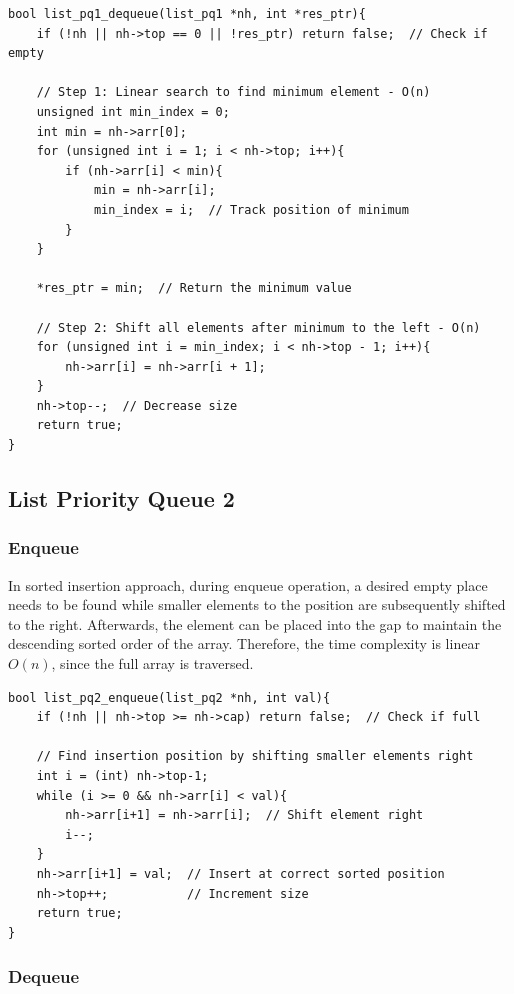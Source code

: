 \documentclass[a4paper,11pt]{article}
\begin{document}
\begin{verbatim}
bool list_pq1_dequeue(list_pq1 *nh, int *res_ptr){
    if (!nh || nh->top == 0 || !res_ptr) return false;  // Check if empty

    // Step 1: Linear search to find minimum element - O(n)
    unsigned int min_index = 0;
    int min = nh->arr[0];
    for (unsigned int i = 1; i < nh->top; i++){
        if (nh->arr[i] < min){
            min = nh->arr[i];
            min_index = i;  // Track position of minimum
        }
    }
    
    *res_ptr = min;  // Return the minimum value
    
    // Step 2: Shift all elements after minimum to the left - O(n)
    for (unsigned int i = min_index; i < nh->top - 1; i++){
        nh->arr[i] = nh->arr[i + 1];
    }
    nh->top--;  // Decrease size
    return true;
}
\end{verbatim}

\subsection*{List Priority Queue 2}
\subsubsection*{Enqueue}
In sorted insertion approach, during enqueue operation, a desired empty place needs to be found while smaller elements to the position are subsequently shifted to the right. Afterwards, the element can be placed into the gap to maintain the descending sorted order of the array. Therefore, the time complexity is linear $O(n)$, since the full array is traversed.

\begin{verbatim}
bool list_pq2_enqueue(list_pq2 *nh, int val){    
    if (!nh || nh->top >= nh->cap) return false;  // Check if full
    
    // Find insertion position by shifting smaller elements right
    int i = (int) nh->top-1;
    while (i >= 0 && nh->arr[i] < val){
        nh->arr[i+1] = nh->arr[i];  // Shift element right
        i--;
    }
    nh->arr[i+1] = val;  // Insert at correct sorted position
    nh->top++;           // Increment size
    return true;
}
\end{verbatim}

\subsubsection*{Dequeue}
\end{document}
